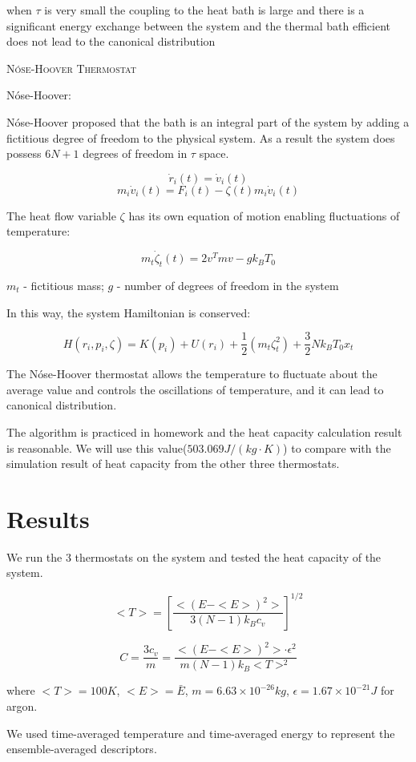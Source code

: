 \documentclass{article}
\begin{document}
\begin{spacing}{1}
when $\tau$ is very small the coupling to the heat bath is large and there is a significant energy exchange between the system and the thermal bath efficient does not lead to the canonical distribution


\vspace{1.5em}
\textsc{\Large Nóse-Hoover Thermostat}

Nóse-Hoover:

Nóse-Hoover proposed that the bath is an integral part of the system by adding a fictitious degree of freedom to the physical system. As a result the system does possess $6N+1$ degrees of freedom in $\tau$ space.

$$\dot r_i(t)=\dot v_i(t)$$
$$m_i\dot v_i(t)=F_i(t)-\zeta(t)m_i\dot v_i(t)$$

The heat flow variable $\zeta$ has its own equation of motion enabling fluctuations of temperature:

$$m_t\dot \zeta_t(t)=2v^Tmv-gk_BT_0$$

$m_t$ - fictitious mass; $g$ - number of degrees of freedom in the system

In this way, the system Hamiltonian is conserved:

$$H(r_i, p_i, \zeta)=K(p_i)+U(r_i)+\frac{1}{2}(m_t\zeta_t^2)+\frac{3}{2}Nk_BT_0x_t$$

The Nóse-Hoover thermostat allows the temperature to fluctuate about the average value and controls the oscillations of temperature, and it can lead to canonical distribution.

The algorithm is practiced in homework and the heat capacity calculation result is reasonable. We will use this value($503.069J/(kg\cdot K)$) to compare with the simulation result of heat capacity from the other three thermostats.


\section{Results}

We run the 3 thermostats on the system and tested the heat capacity of the system.

$$<T>=\left[\frac {<(E-<E>)^2>}{3(N-1)k_Bc_v}\right]^{1/2}$$

$$C=\frac {3c_v}{m}=\frac {<(E-<E>)^2>\cdot \epsilon ^2}{m(N-1)k_B<T>^2}$$

where $<T>=100K$, $<E>=\bar E$, $m=6.63\times 10^{-26}kg$, $\epsilon = 1.67\times 10^{-21} J$ for argon.

We used time-averaged temperature and time-averaged energy to represent the ensemble-averaged descriptors.


\end{spacing}
\end{document}
